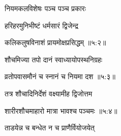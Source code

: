 {\devanagarifont नियमकलविशेषः पञ्च पञ्च प्रकारः  \danda\dontdisplaylinenum }%

\nemslokac

{\devanagarifont हरिहरमुनिभीष्टं धर्मसारं द्विजेन्द्र }%
  \dontdisplaylinenum

\nemslokad

{\devanagarifont कलिकलुषविनाशं प्रायमोक्षप्रसिद्धम् {॥५:२॥} \veg\dontdisplaylinenum }%

\vers


{\devanagarifont शौचमिज्या तपो दानं स्वाध्यायोपस्थनिग्रहः \thinspace{\dandab} \dontdisplaylinenum }%


{\devanagarifont व्रतोपवासमौनं च स्नानं च नियमा दश {॥५:३॥} \veg\dontdisplaylinenum }%


 
{\devanagarifont तत्र शौचादिनिर्देशं वक्ष्यामीह द्विजोत्तम \thinspace{\dandab} \dontdisplaylinenum }%


{\devanagarifont शारीरशौचमाहारो मात्रा भावश्च पञ्चमः {॥५:४॥} \veg\dontdisplaylinenum }%


 

{\devanagarifont ताडयेन्न च बन्धेत न च प्राणैर्वियोजयेत् \thinspace{\dandab} \dontdisplaylinenum }%

